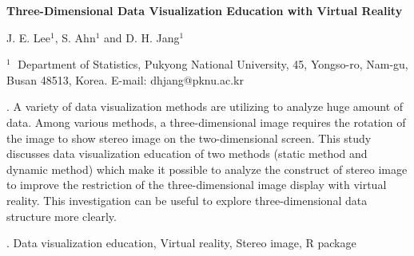 \documentclass[12pt]{article}
\begin{document}
\begin{flushleft}


{\LARGE\bf Three-Dimensional Data Visualization Education with Virtual Reality}


\vspace{1.0cm}

J. E. Lee$^1$, S. Ahn$^1$ and D. H. Jang$^1$

\begin{description}

\item $^1 \;$ Department of Statistics, Pukyong National University, 45, Yongso-ro, Nam-gu,
Busan 48513, Korea. E-mail: dhjang@pknu.ac.kr

\end{description}

\end{flushleft}


\vspace{0.75cm}

. A variety of data visualization methods are utilizing to analyze huge amount of data. Among various methods, a three-dimensional image requires the rotation of the image to show stereo image on the two-dimensional screen. This study discusses data visualization education of two methods (static method and dynamic method) which make it possible to analyze the construct of stereo image to improve the restriction of the three-dimensional image display with virtual reality. This investigation can be useful to explore three-dimensional data structure more clearly.

\vskip 2mm

.
Data visualization education, Virtual reality, Stereo image, R package
\end{document}
